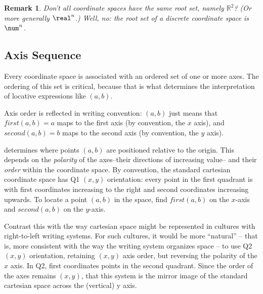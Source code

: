 \documentclass[12pt]{tufte-handout}
\numberwithin{equation}{subsection}
\numberwithin{equation}{subsection}
\newtheorem{remark}{Remark}
\newcommand\cspace{coordinate space}
\newcommand\Rtwo{\(\mathds{R}^2\)}
\begin{document}
  \begin{remark}
    Don't all \cspace{}s have the same root set, namely \Rtwo{}?  (Or
    more generally \(\real ^n\).)  Well, no: the root set of a
    discrete \cspace{} is \(\num ^n\).
  \end{remark}

  \subsection{Axis Sequence}
  \label{subs:orientation}

  Every \cspace{} is associated with an ordered set of one or more
  axes.  The ordering of this set is critical, because that is what
  determines the interpretation of locative expressions like
  \((a,b)\).

  Axis order is reflected in writing convention: \((a,b)\) just means
  that \(first(a,b)=a\) maps to the first axis (by convention, the $x$
  axis), and \(second(a,b)=b\) maps to the second axis (by convention,
  the $y$ axis).

  \newthought{The orientation of a \cspace{}} determines where points
  \((a,b)\) are positioned relative to the origin.  This depends on the
  \textit{polarity} of the axes--their directions of increasing value--
  and their \textit{order} within the \cspace{}.  By convention, the
  standard cartesian \cspace{} has Q1 \((x,y)\) orientation: every point in the first quadrant is
  with first coordinates increasing to the right and second
  coordinates increasing upwards.  To locate a point \((a,b)\) in the
  space, find \(first(a,b)\) on the $x$-axis and \(second(a,b)\) on
  the \(y\)-axis.

  Contrast this with the way cartesian space might be represented in
  cultures with right-to-left writing systems.  For such cultures, it
  would be more ``natural'' -- that is, more consistent with the way the
  writing system organizes space -- to use Q2 \((x,y)\) orientation,
  retaining \((x,y)\) axis order, but reversing the polarity of the
  \(x\) axis.  In Q2, first coordinates%
  points in the second quadrant.  Since the order of the axes remains
  \((x,y)\), that this system is the mirror image of the standard
  cartesian space across the (vertical) y axis.
\end{document}
